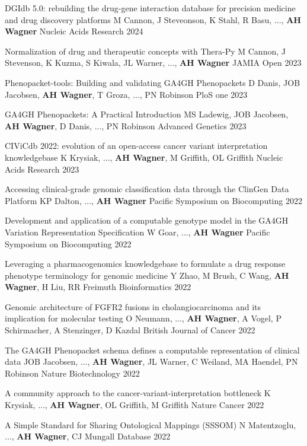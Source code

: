 \pub
{DGIdb 5.0: rebuilding the drug-gene interaction database for precision medicine and drug discovery platforms}
{M Cannon, J Steveonson, K Stahl, R Basu, ..., {\bf AH Wagner}}
{Nucleic Acids Research}
{2024}

\pub
{Normalization of drug and therapeutic concepts with Thera-Py}
{M Cannon, J Stevenson, K Kuzma, S Kiwala, JL Warner, ..., {\bf AH Wagner}}
{JAMIA Open}
{2023}

\pub
{Phenopacket-tools: Building and validating GA4GH Phenopackets}
{D Danis, JOB Jacobsen, {\bf AH Wagner}, T Groza, ..., PN Robinson}
{PloS one}
{2023}

\pub
{GA4GH Phenopackets: A Practical Introduction}
{MS Ladewig, JOB Jacobsen, {\bf AH Wagner}, D Danis, ..., PN Robinson}
{Advanced Genetics}
{2023}

\pub
{CIViCdb 2022: evolution of an open-access cancer variant interpretation knowledgebase}
{K Krysiak, ..., {\bf AH Wagner}, M Griffith, OL Griffith}
{Nucleic Acids Research}
{2023}

\pub
{Accessing clinical-grade genomic classification data through the ClinGen Data Platform}
{KP Dalton, ..., {\bf AH Wagner}}
{Pacific Symposium on Biocomputing}
{2022}

\pub
{Development and application of a computable genotype model in the GA4GH Variation Representation Specification}
{W Goar, ..., {\bf AH Wagner}}
{Pacific Symposium on Biocomputing}
{2022}

\pub
{Leveraging a pharmacogenomics knowledgebase to formulate a drug response phenotype terminology for genomic medicine}
{Y Zhao, M Brush, C Wang,  {\bf AH Wagner}, H Liu, RR Freimuth}
{Bioinformatics}
{2022}

\pub
{Genomic architecture of FGFR2 fusions in cholangiocarcinoma and its implication for molecular testing}
{O Neumann, ..., {\bf AH Wagner}, A Vogel, P Schirmacher, A Stenzinger, D Kazdal}
{British Journal of Cancer}
{2022}

\pub
{The GA4GH Phenopacket schema defines a computable representation of clinical data}
{JOB Jacobsen, ..., {\bf AH Wagner}, JL Warner, C Weiland, MA Haendel, PN Robinson}
{Nature Biotechnology}
{2022}

\pub
{A community approach to the cancer-variant-interpretation bottleneck}
{K Krysiak, ..., {\bf AH Wagner}, OL Griffith, M Griffith}
{Nature Cancer}
{2022}

\pub
{A Simple Standard for Sharing Ontological Mappings (SSSOM)}
{N Matentzoglu, ..., {\bf AH Wagner}, CJ Mungall}
{Database}
{2022}

